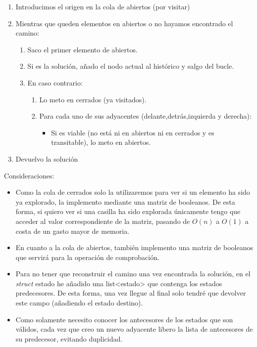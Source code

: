 \documentclass[12pt,spanish]{article}
\begin{document}
\begin{enumerate}


  \item Introducimos el origen en la cola de abiertos (por visitar)
  \item Mientras que queden elementos en abiertos o no hayamos encontrado el camino:
    \begin{enumerate}
    \item Saco el primer elemento de abiertos.
    \item Si es la solución, añado el nodo actual al histórico y salgo del bucle.
    \item En caso contrario:
      \begin{enumerate}
        \item Lo meto en cerrados (ya visitados).
        \item Para cada uno de sus adyacentes (delante,detrás,izquierda y derecha):
          \begin{itemize}      
          \item Si es viable (no está ni en abiertos ni en cerrados y es transitable), lo meto en abiertos.
          \end{itemize}
      \end{enumerate}
    \end{enumerate}
  \item Devuelvo la solución
\end{enumerate}

Consideraciones:

\begin{itemize}
  \item Como la cola de cerrados solo la utilizaremos para ver si un elemento ha sido ya explorado, la implemento mediante una matriz de booleanos. De esta forma, si quiero ver si una casilla ha sido explorada únicamente tengo que acceder al valor correspondiente de la matriz, pasando de $O(n)$ a $O(1)$ a costa de un gasto mayor de memoria. 
  \item En cuanto a la cola de abiertos, también implemento una matriz de booleanos que servirá para la operación de comprobación.
  \item Para no tener que reconstruir el camino una vez encontrada la solución, en el \textit{struct} estado he añadido una list<estado> que contenga los estados predecesores. De esta forma, una vez llegue al final solo tendré que devolver este campo (añadiendo el estado destino).
  \item Como solamente necesito conocer los antecesores de los estados que son válidos, cada vez que creo un nuevo adyacente libero la lista de antecesores de su predecesor, evitando duplicidad.
\end{itemize}
\end{document}
